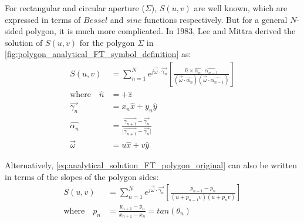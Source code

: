 For rectangular and circular aperture ($\varSigma$), $S(u,v)$ are well known, which are expressed in terms of $Bessel$ and $sinc$ functions respectively. But for a general $N$-sided polygon, it is much more complicated. In 1983, Lee and Mittra \cite{Lee1983} derived the solution of $S(u,v)$ for the polygon $\varSigma$ in \cref{fig:polygon_analytical_FT_symbol_definition} as:
\begin{align}
  S(u,v)                    & = \sum_{n = 1}^{N} e^{j\overrightarrow{\omega}  \cdot \overrightarrow{\gamma_n} } \left[\frac{\hat{n}\times \hat{\alpha_n} \cdot \hat{\alpha_{n-1}}}{(\overrightarrow{\omega} \cdot \hat{\alpha_n})(\overrightarrow{\omega}  \cdot \hat{\alpha_{n-1}})}\right] \label{eq:analytical_solution_FT_polygon_original} \\
  \text{where}\quad \hat{n} & = + \hat{z}                                                                                                                                                                                                                                                                                                       \\
  \overrightarrow{\gamma_n} & = x_n \hat{x} + y_n \hat{y}                                                                                                                                                                                                                                                                                       \\
  \hat{\alpha_n}            & = \frac{\overrightarrow{\gamma_{n+1}}-\overrightarrow{\gamma_n}}{\vert \overrightarrow{\gamma_{n+1}}-\overrightarrow{\gamma_n}\vert}                                                                                                                                                                              \\
  \overrightarrow{\omega}   & = u\hat{x} + v\hat{y}
\end{align}

Alternatively, \cref{eq:analytical_solution_FT_polygon_original} can also be written in terms of the slopes of the polygon sides:
\begin{align}
  S(u,v)                & = \sum_{n = 1}^{N} e^{j\overrightarrow{\omega}  \cdot \overrightarrow{\gamma_n} } \left[\frac{p_{n-1}-p_n}{(u+p_{n-1}v)(u+p_{n}v)}\right] \label{eq:analytical_solution_FT_polygon_slope_form} \\
  \text{where}\quad p_n & = \frac{y_{n+1}-y_n}{x_{n+1}-x_n} = tan(\theta_n)
\end{align}

